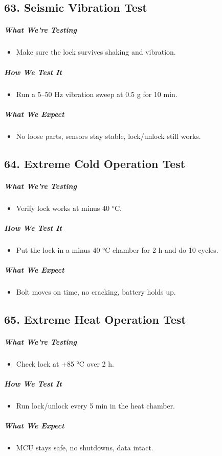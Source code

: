 \subsection*{63. Seismic Vibration Test}
\subparagraph{What We’re Testing}
\begin{itemize}
    \item Make sure the lock survives shaking and vibration.
\end{itemize}
\subparagraph{How We Test It}
\begin{itemize}
    \item Run a 5–50 Hz vibration sweep at 0.5 g for 10 min.
\end{itemize}
\subparagraph{What We Expect}
\begin{itemize}
    \item No loose parts, sensors stay stable, lock/unlock still works.
\end{itemize}

\subsection*{64. Extreme Cold Operation Test}
\subparagraph{What We’re Testing}
\begin{itemize}
    \item Verify lock works at minus 40 °C.
\end{itemize}
\subparagraph{How We Test It}
\begin{itemize}
    \item Put the lock in a minus 40 °C chamber for 2 h and do 10 cycles.
\end{itemize}
\subparagraph{What We Expect}
\begin{itemize}
    \item Bolt moves on time, no cracking, battery holds up.
\end{itemize}

\subsection*{65. Extreme Heat Operation Test}
\subparagraph{What We’re Testing}
\begin{itemize}
    \item Check lock at +85 °C over 2 h.
\end{itemize}
\subparagraph{How We Test It}
\begin{itemize}
    \item Run lock/unlock every 5 min in the heat chamber.
\end{itemize}
\subparagraph{What We Expect}
\begin{itemize}
    \item MCU stays safe, no shutdowns, data intact.
\end{itemize}
